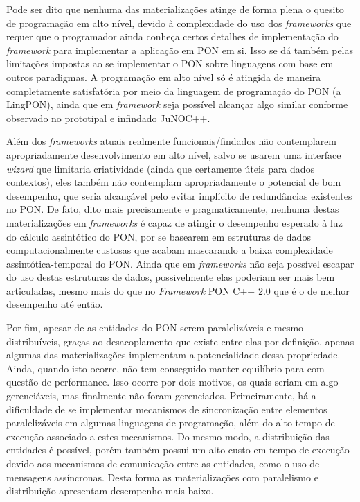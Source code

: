 \FloatBarrier

Pode ser dito que nenhuma das materializações atinge de forma plena o quesito de
programação em alto nível, devido à complexidade do uso dos \textit{frameworks}
que requer que o programador ainda conheça certos detalhes de implementação do
\textit{framework} para implementar a aplicação em PON em si. Isso se dá também
pelas limitações impostas ao se implementar o PON sobre linguagens com base em
outros paradigmas. A programação em alto nível só é atingida de maneira
completamente satisfatória por meio da linguagem de programação do PON (a
LingPON), ainda que em \textit{framework} seja possível alcançar algo similar
conforme observado no prototipal e infindado JuNOC++.

Além dos \textit{frameworks} atuais realmente funcionais/findados não
contemplarem apropriadamente desenvolvimento em alto nível, salvo se usarem uma
interface \textit{wizard} que limitaria criatividade (ainda que certamente úteis
para dados contextos), eles também não contemplam apropriadamente o potencial de
bom desempenho, que seria alcançável pelo evitar implícito de redundâncias
existentes no PON. De fato, dito mais precisamente e pragmaticamente, nenhuma
destas materializações em \textit{frameworks} é capaz de atingir o desempenho
esperado à luz do cálculo assintótico do PON, por se basearem em estruturas de
dados computacionalmente custosas que acabam mascarando a baixa complexidade
assintótica-temporal do PON. Ainda que em \textit{frameworks} não seja possível
escapar do uso destas estruturas de dados, possivelmente elas poderiam ser
mais bem articuladas, mesmo mais do que no \textit{Framework} PON C++ 2.0 que é
o de melhor desempenho até então.

Por fim, apesar de as entidades do PON serem paralelizáveis e mesmo
distribuíveis, graças ao desacoplamento que existe entre elas por definição,
apenas algumas das materializações implementam a potencialidade dessa
propriedade. Ainda, quando isto ocorre, não tem conseguido manter equilíbrio
para com questão de performance. Isso ocorre por dois motivos, os quais seriam
em algo gerenciáveis, mas finalmente não foram gerenciados. Primeiramente, há a
dificuldade de se implementar mecanismos de sincronização entre elementos
paralelizáveis em algumas linguagens de programação, além do alto tempo de
execução associado a estes mecanismos. Do mesmo modo, a distribuição das
entidades é possível, porém também possui um alto custo em tempo de execução
devido aos mecanismos de comunicação entre as entidades, como o uso de mensagens
assíncronas. Desta forma as materializações com paralelismo e distribuição
apresentam desempenho mais baixo.

